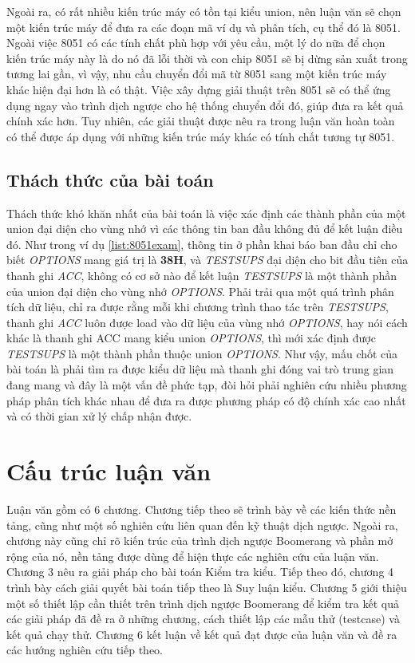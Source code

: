 Ngoài ra, có rất nhiều kiến trúc máy có tồn tại kiểu union, nên luận văn sẽ chọn một kiến trúc máy để đưa ra các đoạn mã ví dụ và phân tích, cụ thể đó là 8051. Ngoài việc 8051 có các tính chất phù hợp với yêu cầu, một lý do nữa để chọn kiến trúc máy này là do nó đã lỗi thời và con chip 8051 sẽ bị dừng sản xuất trong tương lai gần, vì vậy, nhu cầu chuyển đổi mã từ 8051 sang một kiến trúc máy khác hiện đại hơn là có thật. Việc xây dựng giải thuật trên 8051 sẽ có thể ứng dụng ngay vào trình dịch ngược cho hệ thống chuyển đổi đó, giúp đưa ra kết quả chính xác hơn. Tuy nhiên, các giải thuật được nêu ra trong luận văn hoàn toàn có thể được áp dụng với những kiến trúc máy khác có tính chất tương tự 8051.

\subsection{Thách thức của bài toán}

Thách thức khó khăn nhất của bài toán là việc xác định các thành phần của một union đại diện cho vùng nhớ vì các thông tin ban đầu không đủ để kết luận điều đó. Như trong ví dụ \ref{list:8051exam}, thông tin ở phần khai báo ban đầu chỉ cho biết \textit{OPTIONS} mang giá trị là \textbf{38H}, và \textit{TESTSUPS} đại diện cho bit đầu tiên của thanh ghi \textit{ACC}, không có cơ sở nào để kết luận \textit{TESTSUPS} là một thành phần của union đại diện cho vùng nhớ \textit{OPTIONS}. Phải trải qua một quá trình phân tích dữ liệu, chỉ ra được rằng mỗi khi chương trình thao tác trên \textit{TESTSUPS}, thanh ghi \textit{ACC} luôn được load vào dữ liệu của vùng nhớ \textit{OPTIONS}, hay nói cách khác là thanh ghi ACC mang kiểu union \textit{OPTIONS}, thì mới xác định được \textit{TESTSUPS} là một thành phần thuộc union \textit{OPTIONS}. Như vậy, mấu chốt của bài toán là phải tìm ra được kiểu dữ liệu mà thanh ghi đóng vai trò trung gian đang mang và đây là một vấn đề phức tạp, đòi hỏi phải nghiên cứu nhiều phương pháp phân tích khác nhau để đưa ra được phương pháp có độ chính xác cao nhất và có thời gian xử lý chấp nhận được.


\section{Cấu trúc luận văn}

Luận văn gồm có 6 chương. Chương tiếp theo sẽ trình bày về các kiến thức nền tảng, cũng như một số nghiên cứu liên quan đến kỹ thuật dịch ngược. Ngoài ra, chương này cũng chỉ rõ kiến trúc của trình dịch ngược Boomerang và phần mở rộng của nó, nền tảng được dùng để hiện thực các nghiên cứu của luận văn. Chương 3 nêu ra giải pháp cho bài toán Kiểm tra kiểu. Tiếp theo đó, chương 4 trình bày cách giải quyết bài toán tiếp theo là Suy luận kiểu. Chương 5 giới thiệu một số thiết lập cần thiết trên trình dịch ngược Boomerang để kiểm tra kết quả các giải pháp đã đề ra ở những chương, cách thiết lập các mẫu thử (testcase) và kết quả chạy thử. Chương 6 kết luận về kết quả đạt được của luận văn và đề ra các hướng nghiên cứu tiếp theo.
	

